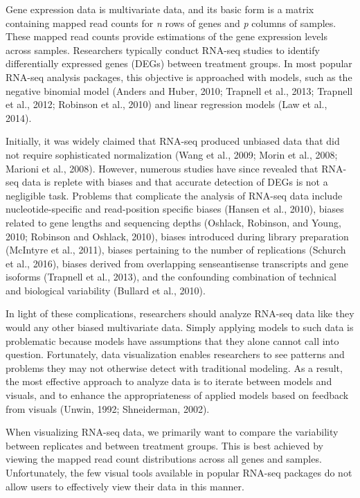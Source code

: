 \documentclass[useAMS,referee]{biom}
\begin{document}
Gene expression data is multivariate data, and its basic form is a matrix containing mapped read counts for \textit{n} rows of genes and \textit{p} columns of samples. These mapped read counts provide estimations of the gene expression levels across samples. Researchers typically conduct RNA-seq studies to identify differentially expressed genes (DEGs) between treatment groups. In most popular RNA-seq analysis packages, this objective is approached with models, such as the negative binomial model (Anders and Huber, 2010; Trapnell et al., 2013; Trapnell et al., 2012; Robinson et al., 2010) and linear regression models (Law et al., 2014).

Initially, it was widely claimed that RNA-seq produced unbiased data that did not require sophisticated normalization (Wang et al., 2009; Morin et al., 2008; Marioni et al., 2008). However, numerous studies have since revealed that RNA-seq data is replete with biases and that accurate detection of DEGs is not a negligible task. Problems that complicate the analysis of RNA-seq data include nucleotide-specific and read-position specific biases (Hansen et al., 2010), biases related to gene lengths and sequencing depths (Oshlack, Robinson, and Young, 2010; Robinson and Oshlack, 2010), biases introduced during library preparation (McIntyre et al., 2011), biases pertaining to the number of replications (Schurch et al., 2016), biases derived from overlapping senseantisense transcripts and gene isoforms (Trapnell et al., 2013), and the confounding combination of technical and biological variability (Bullard et al., 2010).

In light of these complications, researchers should analyze RNA-seq data like they would any other biased multivariate data. Simply applying models to such data is problematic because models have assumptions that they alone cannot call into question. Fortunately, data visualization enables researchers to see patterns and problems they may not otherwise detect with traditional modeling. As a result, the most effective approach to analyze data is to iterate between models and visuals, and to enhance the appropriateness of applied models based on feedback from visuals (Unwin, 1992; Shneiderman, 2002).

When visualizing RNA-seq data, we primarily want to compare the variability between replicates and between treatment groups. This is best achieved by viewing the mapped read count distributions across all genes and samples. Unfortunately, the few visual tools available in popular RNA-seq packages do not allow users to effectively view their data in this manner.
\end{document}
